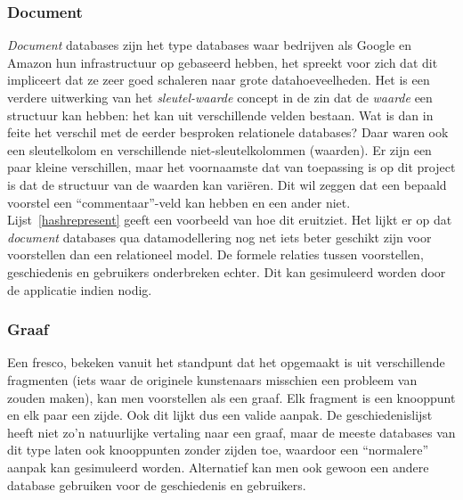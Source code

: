 \subsubsection{Document}
\emph{Document} databases zijn het type databases waar bedrijven als Google en Amazon hun infrastructuur op gebaseerd hebben, het spreekt voor zich dat dit impliceert dat ze zeer goed schaleren naar grote datahoeveelheden. Het is een verdere uitwerking van het \emph{sleutel-waarde} concept in de zin dat de \emph{waarde} een structuur kan hebben: het kan uit verschillende velden bestaan. Wat is dan in feite het verschil met de eerder besproken relationele databases? Daar waren ook een sleutelkolom en verschillende niet-sleutelkolommen (waarden). Er zijn een paar kleine verschillen, maar het voornaamste dat van toepassing is op dit project is dat de structuur van de waarden kan vari\"eren. Dit wil zeggen dat een bepaald voorstel een ``commentaar''-veld kan hebben en een ander niet. Lijst~\ref{hashrepresent} geeft een voorbeeld van hoe dit eruitziet. Het lijkt er op dat \emph{document} databases qua datamodellering nog net iets beter geschikt zijn voor voorstellen dan een relationeel model. De formele relaties tussen voorstellen, geschiedenis en gebruikers onderbreken echter. Dit kan gesimuleerd worden door de applicatie indien nodig.



\subsubsection{Graaf}
Een fresco, bekeken vanuit het standpunt dat het opgemaakt is uit verschillende fragmenten (iets waar de originele kunstenaars misschien een probleem van zouden maken), kan men voorstellen als een graaf. Elk fragment is een knooppunt en elk paar een zijde. Ook dit lijkt dus een valide aanpak. De geschiedenislijst heeft niet zo'n natuurlijke vertaling naar een graaf, maar de meeste databases van dit type laten ook knooppunten zonder zijden toe, waardoor een ``normalere'' aanpak kan gesimuleerd worden. Alternatief kan men ook gewoon een andere database gebruiken voor de geschiedenis en gebruikers.\\

